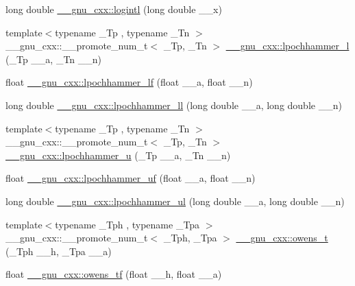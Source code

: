 \begin{DoxyCompactItemize}
long double \hyperlink{group__gnu__math__spec__func_gab17f5cadc8f77ba2666d0d5ecc78de5d}{\+\_\+\+\_\+gnu\+\_\+cxx\+::logintl} (long double \+\_\+\+\_\+x)
\item 
{\footnotesize template$<$typename \+\_\+\+Tp , typename \+\_\+\+Tn $>$ }\\\+\_\+\+\_\+gnu\+\_\+cxx\+::\+\_\+\+\_\+promote\+\_\+num\+\_\+t$<$ \+\_\+\+Tp, \+\_\+\+Tn $>$ \hyperlink{group__gnu__math__spec__func_ga5a60fbbf559aa86dfe918d9ef23e8a74}{\+\_\+\+\_\+gnu\+\_\+cxx\+::lpochhammer\+\_\+l} (\+\_\+\+Tp \+\_\+\+\_\+a, \+\_\+\+Tn \+\_\+\+\_\+n)
\item 
float \hyperlink{group__gnu__math__spec__func_gafb9f3fc457d83f83769297fb172397d6}{\+\_\+\+\_\+gnu\+\_\+cxx\+::lpochhammer\+\_\+lf} (float \+\_\+\+\_\+a, float \+\_\+\+\_\+n)
\item 
long double \hyperlink{group__gnu__math__spec__func_ga6ba405212d353633ef5ee41f683c4630}{\+\_\+\+\_\+gnu\+\_\+cxx\+::lpochhammer\+\_\+ll} (long double \+\_\+\+\_\+a, long double \+\_\+\+\_\+n)
\item 
{\footnotesize template$<$typename \+\_\+\+Tp , typename \+\_\+\+Tn $>$ }\\\+\_\+\+\_\+gnu\+\_\+cxx\+::\+\_\+\+\_\+promote\+\_\+num\+\_\+t$<$ \+\_\+\+Tp, \+\_\+\+Tn $>$ \hyperlink{group__gnu__math__spec__func_ga85e5565a30599065b8ccbc499c5d0d85}{\+\_\+\+\_\+gnu\+\_\+cxx\+::lpochhammer\+\_\+u} (\+\_\+\+Tp \+\_\+\+\_\+a, \+\_\+\+Tn \+\_\+\+\_\+n)
\item 
float \hyperlink{group__gnu__math__spec__func_ga023cc1af92f09d35fc84a19119108980}{\+\_\+\+\_\+gnu\+\_\+cxx\+::lpochhammer\+\_\+uf} (float \+\_\+\+\_\+a, float \+\_\+\+\_\+n)
\item 
long double \hyperlink{group__gnu__math__spec__func_ga44db837251d1d0db819b0215c98f569e}{\+\_\+\+\_\+gnu\+\_\+cxx\+::lpochhammer\+\_\+ul} (long double \+\_\+\+\_\+a, long double \+\_\+\+\_\+n)
\item 
{\footnotesize template$<$typename \+\_\+\+Tph , typename \+\_\+\+Tpa $>$ }\\\+\_\+\+\_\+gnu\+\_\+cxx\+::\+\_\+\+\_\+promote\+\_\+num\+\_\+t$<$ \+\_\+\+Tph, \+\_\+\+Tpa $>$ \hyperlink{group__gnu__math__spec__func_ga7a52e8d5df5b110810c4bdba78a9d2ae}{\+\_\+\+\_\+gnu\+\_\+cxx\+::owens\+\_\+t} (\+\_\+\+Tph \+\_\+\+\_\+h, \+\_\+\+Tpa \+\_\+\+\_\+a)
\item 
float \hyperlink{group__gnu__math__spec__func_gac24d32e9b072c4953654d5559f992871}{\+\_\+\+\_\+gnu\+\_\+cxx\+::owens\+\_\+tf} (float \+\_\+\+\_\+h, float \+\_\+\+\_\+a)
\item 

\end{DoxyCompactItemize}
